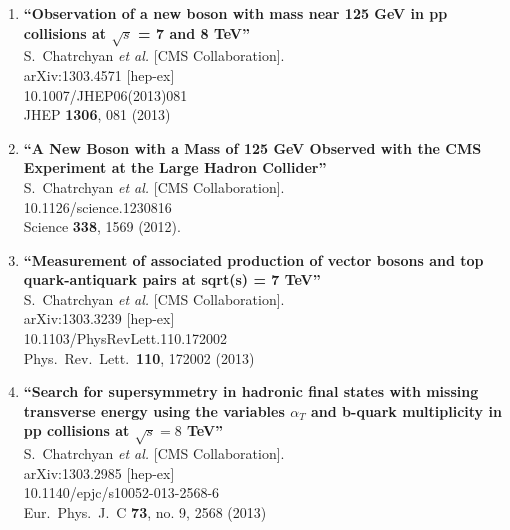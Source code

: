 \documentclass{article}
\begin{document}
\begin{enumerate}
\item%
{\bf ``Observation of a new boson with mass near 125 GeV in pp collisions at $\sqrt{s}$ = 7 and 8 TeV''}
  \\{}S.~Chatrchyan {\it et al.}  [CMS Collaboration].
  \\{}arXiv:1303.4571 [hep-ex]
    \\{}10.1007/JHEP06(2013)081
\\{}JHEP {\bf 1306}, 081 (2013) %


\item%
{\bf ``A New Boson with a Mass of 125 GeV Observed with the CMS Experiment at the Large Hadron Collider''}
  \\{}S.~Chatrchyan {\it et al.}  [CMS Collaboration].
    \\{}10.1126/science.1230816
\\{}Science {\bf 338}, 1569 (2012). %


\item%
{\bf ``Measurement of associated production of vector bosons and top quark-antiquark pairs at sqrt(s) = 7 TeV''}
  \\{}S.~Chatrchyan {\it et al.}  [CMS Collaboration].
  \\{}arXiv:1303.3239 [hep-ex]
    \\{}10.1103/PhysRevLett.110.172002
\\{}Phys.\ Rev.\ Lett.\  {\bf 110}, 172002 (2013) %


\item%
{\bf ``Search for supersymmetry in hadronic final states with missing transverse energy using the variables $\alpha_T$ and b-quark multiplicity in pp collisions at $\sqrt s=8$ TeV''}
  \\{}S.~Chatrchyan {\it et al.}  [CMS Collaboration].
  \\{}arXiv:1303.2985 [hep-ex]
    \\{}10.1140/epjc/s10052-013-2568-6
\\{}Eur.\ Phys.\ J.\ C {\bf 73}, no. 9, 2568 (2013) %



\end{enumerate}
\end{document}
